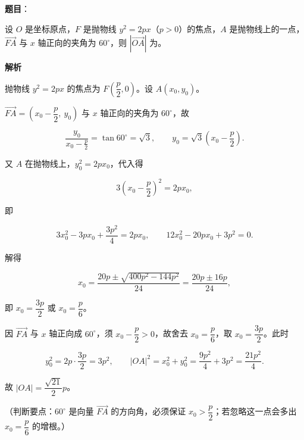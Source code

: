 \begin{answer}

\textbf{题目}：

设 $O$ 是坐标原点，$F$ 是抛物线 $y^2=2px$（$p>0$）的焦点，$A$ 是抛物线上的一点，$\overrightarrow{FA}$ 与 $x$ 轴正向的夹角为 $60^\circ$，则 $\left|\overrightarrow{OA}\right|$ 为\gkblank{}。

\textbf{解析}

抛物线 $y^2=2px$ 的焦点为 $F\left(\dfrac p2,0\right)$。设 $A(x_0,y_0)$。

$\overrightarrow{FA}=\left(x_0-\dfrac p2,\ y_0\right)$ 与 $x$ 轴正向的夹角为 $60^\circ$，故

\nopagebreak[4]
\[\frac{y_0}{x_0-\frac p2}=\tan60^\circ=\sqrt3,\qquad y_0=\sqrt3\left(x_0-\frac p2\right).\]

又 $A$ 在抛物线上，$y_0^2=2px_0$，代入得

\nopagebreak[4]
\[3\left(x_0-\frac p2\right)^2=2px_0,\]

即

\nopagebreak[4]
\[3x_0^2-3px_0+\frac{3p^2}{4}=2px_0,\qquad 12x_0^2-20px_0+3p^2=0.\]

解得

\nopagebreak[4]
\[x_0=\frac{20p\pm\sqrt{400p^2-144p^2}}{24}=\frac{20p\pm16p}{24},\]

即 $x_0=\dfrac{3p}{2}$ 或 $x_0=\dfrac p6$。

因 $\overrightarrow{FA}$ 与 $x$ 轴正向成 $60^\circ$，须 $x_0-\dfrac p2>0$，故舍去 $x_0=\dfrac p6$，取 $x_0=\dfrac{3p}{2}$。此时

\nopagebreak[4]
\[y_0^2=2p\cdot\frac{3p}{2}=3p^2,\qquad |OA|^2=x_0^2+y_0^2=\frac{9p^2}{4}+3p^2=\frac{21p^2}{4}.\]

故 $|OA|=\dfrac{\sqrt{21}}{2}p$。

（判断要点：$60^\circ$ 是向量 $\overrightarrow{FA}$ 的方向角，必须保证 $x_0>\dfrac p2$；若忽略这一点会多出 $x_0=\dfrac p6$ 的增根。）


\end{answer}
